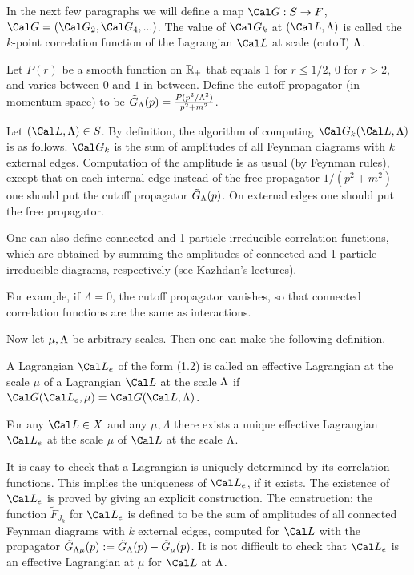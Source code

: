 In the next few paragraphs we will define a map ${\Cal G}: S\to F$,
${\Cal G}=({\Cal G}_2,{\Cal G}_4,...)$.
The value of ${\Cal G}_k$ at $(\Cal L,\Lambda)$ is called
the $k$-point correlation function of the Lagrangian $\Cal L$ 
at scale (cutoff) $\Lambda$.  

Let $P(r)$ be a smooth function on $\Bbb R_+$ that equals 
$1$ for $r\le 1/2$, $0$ for $r>2$, and varies between $0$ and $1$ in
between. Define the cutoff propagator (in momentum space) to be
$\tilde G_\Lambda(p)=\frac{P(p^2/\Lambda^2)}{p^2+m^2}$. 

Let $(\Cal L,\L)\in S$. 
By definition, the algorithm of computing ${\Cal G}_k(\Cal L,\L)$ 
is as follows. ${\Cal G}_k$ is the sum of amplitudes of all Feynman 
diagrams with $k$ external edges. Computation of the amplitude
is as usual (by Feynman rules), except that on each internal edge
instead of the free propagator $1/(p^2+m^2)$ one should put the cutoff 
propagator $\tilde G_\Lambda(p)$. On external edges one should put the free 
propagator.  

One can also define connected and 1-particle irreducible 
correlation functions, which are obtained by summing 
the amplitudes of connected and 1-particle irreducible 
diagrams, respectively (see Kazhdan's lectures). 

For example, if $\Lambda=0$, 
the cutoff propagator vanishes, so that 
connected correlation functions are 
the same as interactions. 

Now let $\mu,\Lambda$ be arbitrary scales.
Then one can make the following definition.

 A Lagrangian $\Cal L_e$ of the form (1.2) 
is called an effective Lagrangian at the scale $\mu$ of
a Lagrangian $\Cal L$ at the scale $\Lambda$ if 
${\Cal G}(\Cal L_e,\mu)={\Cal G}(\Cal L,\Lambda)$.
\endproclaim

 For any $\Cal L\in X$ 
and any $\mu,\Lambda$ there exists a unique 
effective Lagrangian
$\Cal L_e$ 
at the scale $\mu$ of $\Cal L$ at the scale $\Lambda$. 
\endproclaim

It is easy to check that a Lagrangian is uniquely 
determined by its correlation functions. 
This implies the uniqueness of $\Cal L_e$, if it exists. 
The existence of $\Cal L_e$ is proved by giving an explicit 
construction. The construction: the function $\tilde F_{J_k}$
for $\Cal L_e$ is defined to be the sum of amplitudes of all 
connected Feynman diagrams with $k$ external edges, computed 
for $\Cal L$ with
the propagator $\tilde G_{\Lambda\mu}(p):=\tilde G_\Lambda(p)-\tilde G_\mu(p)$.
It is not difficult to check 
that $\Cal L_e$ is an effective Lagrangian at $\mu$
for $\Cal L$ at $\Lambda$. 
\enddemo

